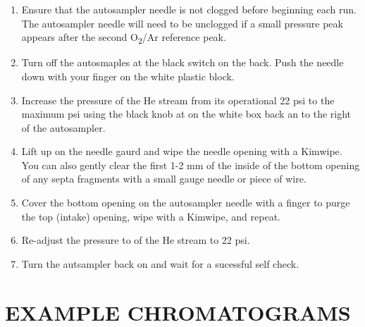 \documentclass[]{article}
\providecommand{\tightlist}{%
  \setlength{\itemsep}{0pt}\setlength{\parskip}{0pt}}
\begin{document}
\begin{enumerate}
\def\labelenumi{\arabic{enumi}.}
\tightlist
\item
  Ensure that the autosampler needle is not clogged before beginning
  each run. The autosampler needle will need to be unclogged if a small
  pressure peak appears after the second O\textsubscript{2}/Ar reference
  peak.\\
\item
  Turn off the autosmaples at the black switch on the back. Push the
  needle down with your finger on the white plastic block.\\
\item
  Increase the pressure of the He stream from its operational 22 psi to
  the maximum psi using the black knob at on the white box back an to
  the right of the autosampler.\\
\item
  Lift up on the needle gaurd and wipe the needle opening with a
  Kimwipe. You can also gently clear the first 1-2 mm of the inside of
  the bottom opening of any septa fragments with a small gauge needle or
  piece of wire.\\
\item
  Cover the bottom opening on the autosampler needle with a finger to
  purge the top (intake) opening, wipe with a Kimwipe, and repeat.\\
\item
  Re-adjust the pressure to of the He stream to 22 psi.\\
\item
  Turn the autsampler back on and wait for a sucessful self check.
\end{enumerate}

\section{EXAMPLE CHROMATOGRAMS}\label{example-chromatograms}
\end{document}
